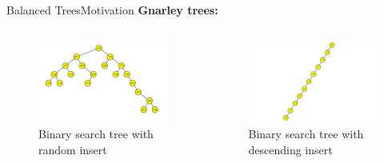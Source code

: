 \begin{frame}{Balanced Trees}{Motivation}
  \textbf{Gnarley trees:}\hfill
  \qrcode[height=5em]{\GnarleyTreesLink}\\
  \vspace{-1.0em}
  \begin{columns}
    \begin{column}[t]{0.5\linewidth}
      \begin{figure}
        \includegraphics[width=\linewidth]{Lecture/Images/Motivation/BinarySearchTree_Random.png}
        \caption{Binary search tree with random insert~\cite{gnarley_trees}}
        \label{fig:motivation:binary_search_tree_random}
      \end{figure}
    \end{column}
    \begin{column}[t]{0.5\linewidth}
      \begin{figure}
        \includegraphics[width=\linewidth]{Lecture/Images/Motivation/BinarySearchTree_Ordered.png}
        \caption{Binary search tree with descending insert~\cite{gnarley_trees}}
        \label{fig:motivation:binary_search_tree_ordered}
      \end{figure}
    \end{column}
  \end{columns}
\end{frame}


